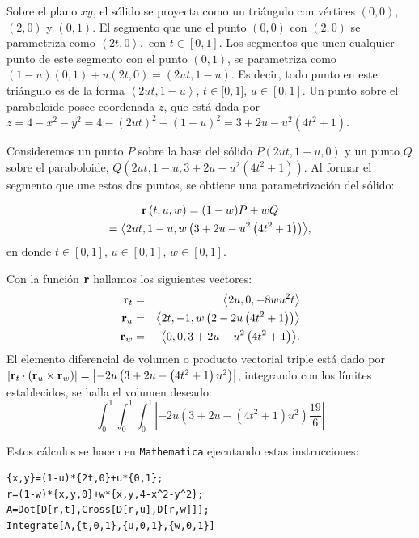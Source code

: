 Sobre el plano $xy$, el sólido se proyecta como un triángulo con vértices $(0,0)$, $(2,0)$ y $(0,1)$. El segmento que une el punto $(0,0)$ con $(2,0)$ se parametriza como $\left\langle 2t,0\right\rangle\!, $ con $t\in [ 0,1]$.
Los segmentos que unen cualquier punto de este segmento con el punto
$(0,1)$, se parametriza como
$(1-u)(0,1)+u(2t,0)= \left(2ut,1-u\right) $.
Es decir, todo punto en este triángulo es de la forma
$\left\langle 2ut,1-u\right\rangle $, $t\in\lbrack 0,1]$, $u\in [ 0,1]$.
Un punto sobre el paraboloide posee coordenada $z$, que está dada por
$z=4-x^{2}-y^{2}=4-(2ut)^2-(1-u)^2= 3+2u-u^{2}\left(4t^{2}+1\right) $.

Consideremos un punto $P$ sobre la base del sólido {\small $P\left( 2ut,1-u,0\right)$}
y un punto $Q$ sobre el paraboloide, {\small $Q\left( 2ut,1-u,3+2u-u^{2}\left( 4t^{2}+1\right) \right)$}.
Al formar el segmento que une estos dos puntos, se obtiene una parametrización del sólido:

\begin{multline*}
{\bf r}\left( t,u,w\right) = (1-w)P +wQ \\
= \left\langle 2ut,1-u,w\left( 3+2u-u^{2}\left( 4t^{2}+1\right)
\right) \right\rangle\!,
\end{multline*}
en donde $t\in [ 0,1]$, $u\in [ 0,1]$, $w\in [ 0,1]$.

Con la función ${\bf r}$ hallamos los siguientes vectores:
\begin{eqnarray*}
{\bf r}_{t} &=& \left\langle 2u,0,-8wu^{2}t\right\rangle \\
{\bf r}_{u} &=& \left\langle 2t,-1,w\left( 2-2u\left( 4t^{2}+1\right) \right) \right\rangle \\
{\bf r}_{w} &=& \left\langle 0,0,3+2u-u^{2}\left( 4t^{2}+1\right) \right\rangle\!.
\end{eqnarray*}
El elemento diferencial de volumen o producto vectorial triple está dado por
$|{\bf r}_{t} \cdot ({\bf r}_{u} \times {\bf r}_{w})| =\left| -2u\left( 3+2u-\left(4t^{2}+1\right) u^{2}\right) \right| $,
integrando con los límites establecidos, se halla el volumen deseado:
\[\int_{0}^{1}\int_{0}^{1}\int_{0}^{1}\left| -2u\left( 3+2u-\left(4t^{2}+1\right) u^{2}\right)  \frac{19}{6}\right|\]

Estos cálculos se hacen en \verb"Mathematica" ejecutando estas instrucciones:

\begin{tcolorbox}[title=\bf Instrucción en \verb"Mathematica"]\begin{Verbatim}[formatcom=\letraverbatim]
{x,y}=(1-u)*{2t,0}+u*{0,1};
r=(1-w)*{x,y,0}+w*{x,y,4-x^2-y^2};
A=Dot[D[r,t],Cross[D[r,u],D[r,w]]];
Integrate[A,{t,0,1},{u,0,1},{w,0,1}]
\end{Verbatim}
\end{tcolorbox}

